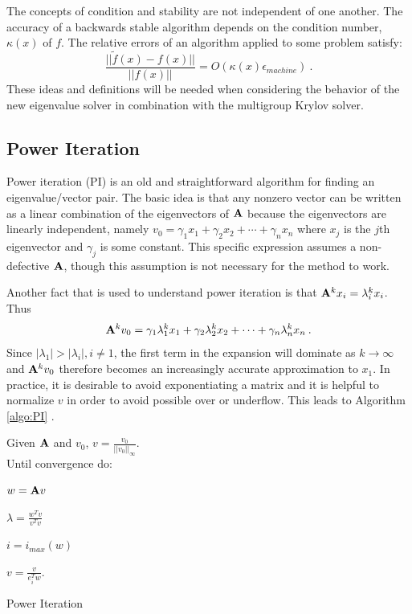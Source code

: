 The concepts of condition and stability are not independent of one another. The accuracy of a backwards stable algorithm depends on the condition number, $\kappa(x)$ of $f$. The relative errors of an algorithm applied to some problem satisfy:
%
\begin{equation}
  \frac{||\tilde{f}(x) - f(x)||}{||f(x)||} = O(\kappa(x) \epsilon _{machine}) \:.
\end{equation}
These ideas and definitions will be needed when considering the behavior of the new eigenvalue solver in combination with the multigroup Krylov solver. 

\subsection{Power Iteration}
Power iteration (PI) is an old and straightforward algorithm for finding an eigenvalue/vector pair. The basic idea is that any nonzero vector can be written as a linear combination of the eigenvectors of $\mathbf{A}$ because the eigenvectors are linearly independent, namely $v_0 = \gamma_1 x_1 + \gamma_2 x_2 + \cdots + \gamma_n x_n$ where $x_{j}$ is the $j$th eigenvector and $\gamma_{j}$ is some constant. This specific expression assumes a non-defective $\mathbf{A}$, though this assumption is not necessary for the method to work. 

Another fact that is used to understand power iteration is that $\mathbf{A}^k x_i = \lambda_i^k x_i$. Thus
%
\begin{equation}
  \mathbf{A}^k v_{0} = \gamma_1 \lambda_1^k x_1 + \gamma_2 \lambda_2^k x_2 + \cdots + \gamma_n \lambda_n^k x_n \:.
  \label{eq:Ak}
\end{equation}
%
Since $|\lambda_1| > |\lambda_i|, i \ne 1$, the first term in the expansion will dominate as $k \to \infty$ and $\mathbf{A}^k v_{0}$ therefore becomes an increasingly accurate approximation to $x_1$. In practice, it is desirable to avoid exponentiating a matrix and it is helpful to normalize $v$ in order to avoid possible over or underflow. This leads to Algorithm \ref{algo:PI} \cite{Stewart2001}. 
%
\begin{algorithm}
  Given $\mathbf{A}$ and $v_0$, $v = \frac{v_{0}}{||v_{0}||_{\infty}}$. \\
  Until convergence do:
  \begin{list}{}{\hspace{2em}}
    \item $w = \mathbf{A}v$
    \item $\lambda = \frac{w^{T}v}{v^{T}v}$
    \item $i = i_{max}(w)$
    \item $v = \frac{v}{e_{i}^{T}w}$.
  \end{list}
  \caption{Power Iteration}
  \label{algo:PI}
\end{algorithm}

